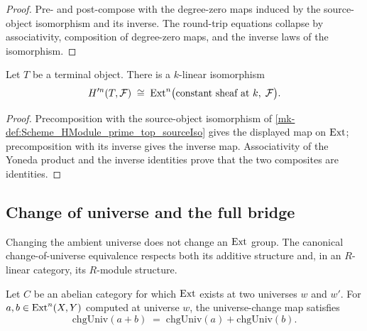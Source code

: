 \begin{proof}
  \leanok


Pre- and post-compose with the degree-zero maps induced by the source-object isomorphism and its inverse. The round-trip equations collapse by associativity, composition of degree-zero maps, and the inverse laws of the isomorphism.
\end{proof}

\begin{definition}\label{mk-def:Scheme_HModule_prime_top_linearEquiv}
  \leanok


  Let \(T\) be a terminal object. There is a \(k\)-linear isomorphism
  \[
    H^{\prime n}(T, \mathcal F) \;\cong\; \operatorname{Ext}^{n}\bigl(\text{constant sheaf at }k,\; \mathcal F\bigr).
  \]
\end{definition}

\begin{proof}
  \leanok


Precomposition with the source-object isomorphism of \ref{mk-def:Scheme_HModule_prime_top_sourceIso} gives the displayed map on \(\operatorname{Ext}\); precomposition with its inverse gives the inverse map. Associativity of the Yoneda product and the inverse identities prove that the two composites are identities.
\end{proof}

\subsection{Change of universe and the full bridge}

Changing the ambient universe does not change an \(\operatorname{Ext}\) group. The canonical change-of-universe equivalence respects both its additive structure and, in an \(R\)-linear category, its \(R\)-module structure.

\begin{lemma}\label{mk-lem:Abelian_Ext_chgUniv_add}
  \leanok

  Let \(C\) be an abelian category for which \(\operatorname{Ext}\) exists at two universes \(w\) and \(w'\). For \(a, b \in \operatorname{Ext}^{n}(X, Y)\) computed at universe \(w\), the universe-change map satisfies
  \[
    \mathrm{chgUniv}(a + b) \;=\; \mathrm{chgUniv}(a) + \mathrm{chgUniv}(b).
  \]
\end{lemma}

